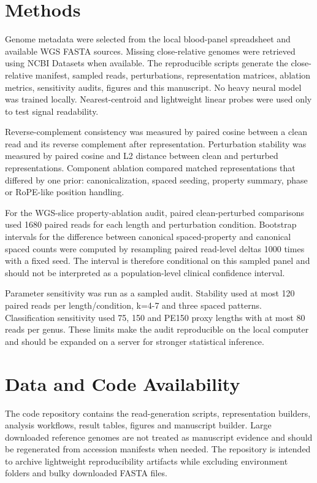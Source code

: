 \documentclass[11pt]{article}
\begin{document}
\section*{Methods}

Genome metadata were selected from the local blood-panel spreadsheet and available WGS FASTA sources. Missing close-relative genomes were retrieved using NCBI Datasets when available. The reproducible scripts generate the close-relative manifest, sampled reads, perturbations, representation matrices, ablation metrics, sensitivity audits, figures and this manuscript. No heavy neural model was trained locally. Nearest-centroid and lightweight linear probes were used only to test signal readability.


Reverse-complement consistency was measured by paired cosine between a clean read and its reverse complement after representation. Perturbation stability was measured by paired cosine and L2 distance between clean and perturbed representations. Component ablation compared matched representations that differed by one prior: canonicalization, spaced seeding, property summary, phase or RoPE-like position handling.


For the WGS-slice property-ablation audit, paired clean-perturbed comparisons used 1680 paired reads for each length and perturbation condition. Bootstrap intervals for the difference between canonical spaced-property and canonical spaced counts were computed by resampling paired read-level deltas 1000 times with a fixed seed. The interval is therefore conditional on this sampled panel and should not be interpreted as a population-level clinical confidence interval.


Parameter sensitivity was run as a sampled audit. Stability used at most 120 paired reads per length/condition, k=4-7 and three spaced patterns. Classification sensitivity used 75, 150 and PE150 proxy lengths with at most 80 reads per genus. These limits make the audit reproducible on the local computer and should be expanded on a server for stronger statistical inference.


\section*{Data and Code Availability}

The code repository contains the read-generation scripts, representation builders, analysis workflows, result tables, figures and manuscript builder. Large downloaded reference genomes are not treated as manuscript evidence and should be regenerated from accession manifests when needed. The repository is intended to archive lightweight reproducibility artifacts while excluding environment folders and bulky downloaded FASTA files.
\end{document}
